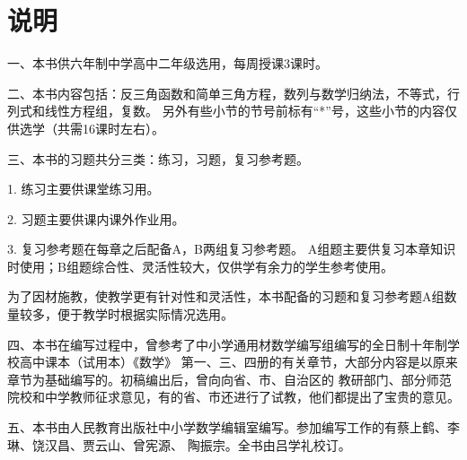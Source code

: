 
\chapter{说明}

一、本书供六年制中学高中二年级选用，每周授课3课时。

二、本书内容包括：反三角函数和简单三角方程，数列与数学归纳法，不等式，行列式和线性方程组，复数。
另外有些小节的节号前标有“*”号，这些小节的内容仅供选学（共需16课时左右）。

三、本书的习题共分三类：练习，习题，复习参考题。

1. 练习\quad 主要供课堂练习用。

2. 习题\quad 主要供课内课外作业用。

3. 复习参考题\quad 在每章之后配备A，B两组复习参考题。
A组题主要供复习本章知识时使用；B组题综合性、灵活性较大，仅供学有余力的学生参考使用。

为了因材施教，使教学更有针对性和灵活性，本书配备的习题和复习参考题A组数量较多，便于教学时根据实际情况选用。

四、本书在编写过程中，曾参考了中小学通用材数学编写组编写的全日制十年制学校高中课本（试用本）《数学》
第一、三、四册的有关章节，大部分内容是以原来章节为基础编写的。初稿编出后，曾向向省、市、自治区的
教研部门、部分师范院校和中学教师征求意见，有的省、市还进行了试教，他们都提出了宝贵的意见。

五、本书由人民教育出版社中小学数学编辑室编写。参加编写工作的有蔡上鹤、李琳、饶汉昌、贾云山、曾宪源、
陶振宗。全书由吕学礼校订。
